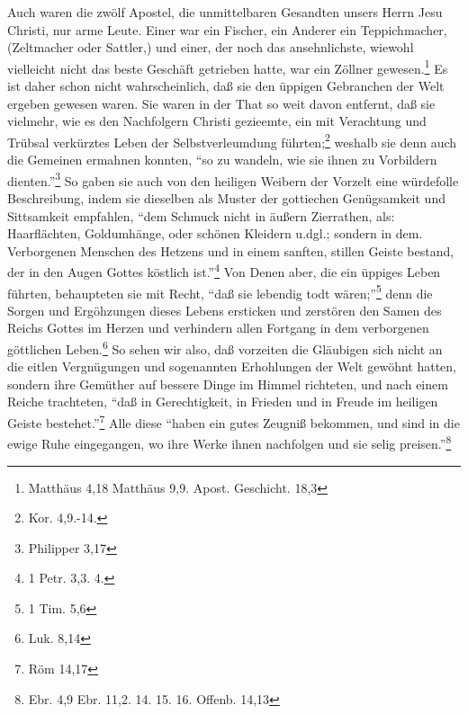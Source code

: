 Auch waren die zwölf Apostel, die unmittelbaren Gesandten unsers Herrn Jesu
Christi, nur arme Leute. Einer war ein Fischer, ein Anderer ein Teppichmacher,
(Zeltmacher oder Sattler,) und einer, der noch das ansehnlichste, wiewohl
vielleicht nicht das beste Geschäft getrieben hatte, war ein Zöllner
gewesen.\footnote{Matthäus 4,18 Matthäus 9,9. Apost. Geschicht. 18,3} Es ist daher
schon nicht wahrscheinlich, daß sie den üppigen Gebranchen der Welt ergeben
gewesen waren. Sie waren in der That so weit davon entfernt, daß sie vielmehr,
wie es den Nachfolgern Christi gezieemte, ein mit Verachtung und Trübsal
verkürztes Leben der Selbstverleumdung führten;\footnote{Kor. 4,9.-14.} weshalb
sie denn auch die Gemeinen ermahnen konnten, "`so zu wandeln, wie sie ihnen zu
Vorbildern dienten."'\footnote{Philipper 3,17} So gaben sie auch von den heiligen
Weibern der Vorzelt eine würdefolle Beschreibung, indem sie dieselben als Muster
der gottiechen Genügsamkeit und Sittsamkeit empfahlen, "`dem Schmuck nicht in
äußern Zierrathen, als: Haarflächten, Goldumhänge, oder schönen Kleidern u.dgl.;
sondern in dem. Verborgenen Menschen des Hetzens und in einem sanften, stillen
Geiste bestand, der in den Augen Gottes köstlich ist."'\footnote{1 Petr. 3,3.
4.} Von Denen aber, die ein üppiges Leben führten, behaupteten sie mit Recht,
"`daß sie lebendig todt wären;"'\footnote{1 Tim. 5,6} denn die Sorgen und
Ergöhzungen dieses Lebens ersticken und zerstören den Samen des Reichs Gottes im
Herzen und verhindern allen Fortgang in dem verborgenen göttlichen
Leben.\footnote{Luk. 8,14} So sehen wir also, daß vorzeiten die Gläubigen sich
nicht an die eitlen Vergnügungen und sogenannten Erhohlungen der Welt gewöhnt
hatten, sondern ihre Gemüther auf bessere Dinge im Himmel richteten, und nach
einem Reiche trachteten, "`daß in Gerechtigkeit, in Frieden und in Freude im
heiligen Geiste bestehet."'\footnote{Röm 14,17} Alle diese "`haben ein gutes
Zeugniß bekommen, und sind in die ewige Ruhe eingegangen, wo ihre Werke ihnen
nachfolgen und sie selig preisen."'\footnote{Ebr. 4,9 Ebr. 11,2. 14. 15. 16.
Offenb. 14,13}

